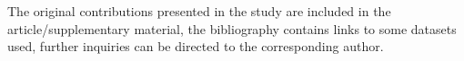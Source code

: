 \documentclass[utf8]{FrontiersinVancouver} %
\begin{document}
The original contributions presented in the study are included in the article/supplementary
material, the bibliography contains links to some datasets used, further inquiries can be directed
to the corresponding author.


%  


 


\nocite{*} %


\end{document}
